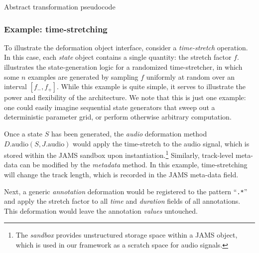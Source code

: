 \documentclass{article}
\begin{document}
\begin{algorithm}[t]
\caption{Abstract transformation pseudocode\label{alg:transformation}}
\begin{algorithmic}[1]
            \EndFor{}
        \EndFor{}
    \EndFor{}
    \EndFunction{}
\end{algorithmic}
\end{algorithm}


\subsubsection{Example: time-stretching}
To illustrate the deformation object interface, consider a \emph{time-stretch} operation.
In this case, each \emph{state} object contains a single quantity: the stretch factor $f$.
 illustrates the state-generation logic for a randomized
time-stretcher, in which some $n$ examples are generated by sampling $f$ uniformly at
random over an interval $[f_-, f_+]$.  While this example is quite
simple, it serves to illustrate the power and flexibility of the architecture.  We note
that this is just one example: one could easily imagine sequential state generators that
sweep out a deterministic parameter grid, or perform otherwise arbitrary computation.

Once a state $S$ has been generated, the \emph{audio} deformation method
$D.\text{audio}(S, J.\text{audio})$ 
would apply the time-stretch to the audio signal, which is stored within the 
JAMS sandbox upon instantiation.\footnote{The \emph{sandbox} provides unstructured 
storage space within a JAMS object, which is used in our framework as a scratch space for 
audio signals.}  Similarly, track-level meta-data can be modified by the \emph{metadata}
method.  In this example, time-stretching will change the track length, which is recorded
in the JAMS meta-data field.

Next, a generic \emph{annotation} deformation would be registered to the pattern
``\texttt{.*}'' and apply the stretch factor to all \emph{time} and \emph{duration} 
fields of all annotations.  This deformation would leave the annotation 
\emph{values} untouched.
\end{document}

